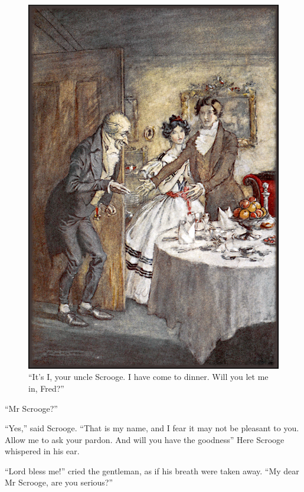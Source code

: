 \documentclass[paper=5.5in:8.5in,BCOR=5mm,twoside,DIV=calc,12pt,usegeometry]{scrbook} %
\begin{document}
\begin{figure}[p]
\begin{minipage}[c]{\linewidth}
\includegraphics[width=\linewidth]{freddinner}
\caption*{\enquote{It's I, your uncle Scrooge. I have come to dinner. Will you let me in, Fred?}}
\end{minipage}
\end{figure}

\enquote{Mr Scrooge?}

\enquote{Yes,} said Scrooge. \enquote{That is my name, and I fear it may not be pleasant to you. Allow me to ask your pardon. And will you have the goodness\textemdash \textemdash } Here Scrooge whispered in his ear.

\enquote{Lord bless me!} cried the gentleman, as if his breath were taken away. \enquote{My dear Mr Scrooge, are you serious?}
\end{document}
